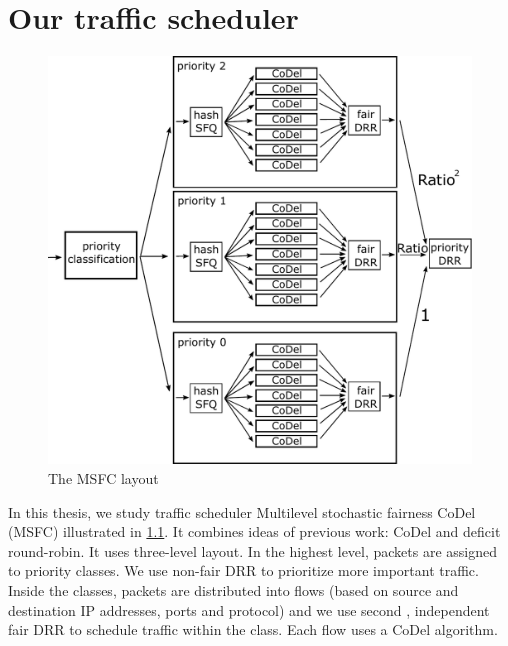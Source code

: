 \chapter{Our traffic scheduler}
\label{chap02}

\begin{figure}
	\centering
	\includegraphics[width=137mm]{drawings/msfc}
	\caption{The MSFC layout}
	\label{fig10:msfc}
\end{figure}

In this thesis, we study  traffic scheduler Multilevel stochastic fairness  CoDel (MSFC)  illustrated in \ref{fig10:msfc}. It combines ideas of previous work: CoDel and deficit round-robin. It uses three-level layout. In the highest level, packets are assigned to priority classes. We use non-fair DRR to prioritize more important traffic. Inside the classes,  packets are distributed into flows (based on source and destination IP addresses, ports and protocol) and we use second , independent fair DRR to schedule traffic within the class. Each flow uses a CoDel algorithm.


